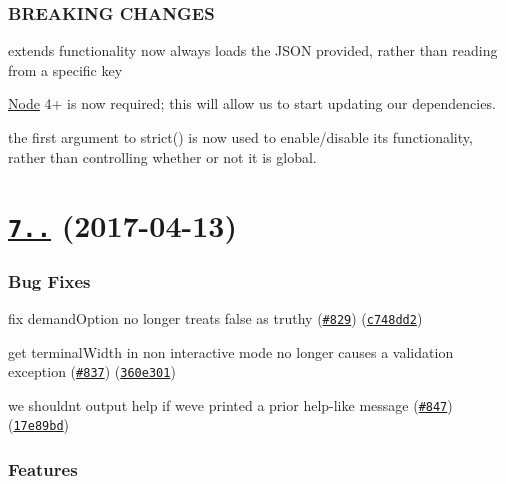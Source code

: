 \subsubsection*{B\+R\+E\+A\+K\+I\+NG C\+H\+A\+N\+G\+ES}


\begin{DoxyItemize}
\item extends functionality now always loads the J\+S\+ON provided, rather than reading from a specific key
\item \mbox{\hyperlink{classNode}{Node}} 4+ is now required; this will allow us to start updating our dependencies.
\item the first argument to strict() is now used to enable/disable its functionality, rather than controlling whether or not it is global.
\end{DoxyItemize}

\label{_7.1.0}%
 \section*{\href{https://github.com/yargs/yargs/compare/v7.0.2...v7.1.0}{\tt 7..} (2017-\/04-\/13)}

\subsubsection*{Bug Fixes}


\begin{DoxyItemize}
\item fix demand\+Option no longer treats \textquotesingle{}false\textquotesingle{} as truthy (\href{https://github.com/yargs/yargs/issues/829}{\tt \#829}) (\href{https://github.com/yargs/yargs/commit/c748dd2}{\tt c748dd2})
\item get terminal\+Width in non interactive mode no longer causes a validation exception (\href{https://github.com/yargs/yargs/issues/837}{\tt \#837}) (\href{https://github.com/yargs/yargs/commit/360e301}{\tt 360e301})
\item we shouldn\textquotesingle{}t output help if we\textquotesingle{}ve printed a prior help-\/like message (\href{https://github.com/yargs/yargs/issues/847}{\tt \#847}) (\href{https://github.com/yargs/yargs/commit/17e89bd}{\tt 17e89bd})
\end{DoxyItemize}

\subsubsection*{Features}



